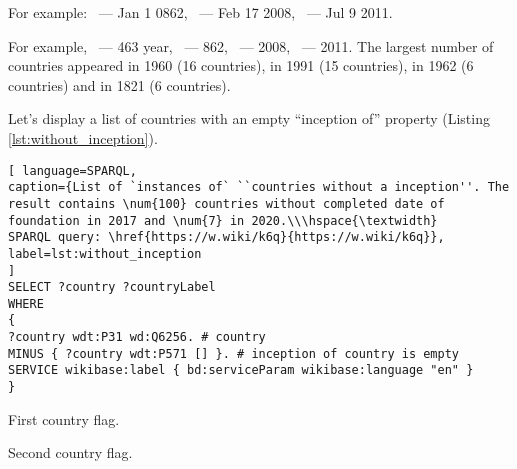 For example: ~--- Jan 1 0862, ~--- Feb 17 2008, ~--- Jul 9 2011.

For example, ~--- 463 year, ~--- 862, ~--- 2008, ~--- 2011.
The largest number of countries appeared in 1960 (16 countries), in 1991 (15 countries), in 1962 (6 countries) and in 1821 (6 countries).

Let's display a list of countries with an empty ``inception of'' property (Listing \ref{lst:without_inception}).
\begin{lstlisting}[ language=SPARQL, 
caption={List of `instances of` ``countries without a inception''. The result contains \num{100} countries without completed date of foundation in 2017 and \num{7} in 2020.\\\hspace{\textwidth}
SPARQL query: \href{https://w.wiki/k6q}{https://w.wiki/k6q}},
label=lst:without_inception
]
SELECT ?country ?countryLabel 
WHERE
{
?country wdt:P31 wd:Q6256. # country
MINUS { ?country wdt:P571 [] }. # inception of country is empty
SERVICE wikibase:label { bd:serviceParam wikibase:language "en" }
}
\end{lstlisting}



\begin{marginfigure}[0.0cm]
	{
		\setlength{\fboxsep}{0pt}%
		\setlength{\fboxrule}{1pt}%
	}
	\caption{First country flag.}%
	\label{fig:flag_kor}%
\end{marginfigure}

\begin{marginfigure}[4.0cm]
	{
		\setlength{\fboxsep}{0pt}%
		\setlength{\fboxrule}{1pt}%
	}
	\caption{Second country flag.}%
	\label{fig:flag_mongolia}%
\end{marginfigure}


